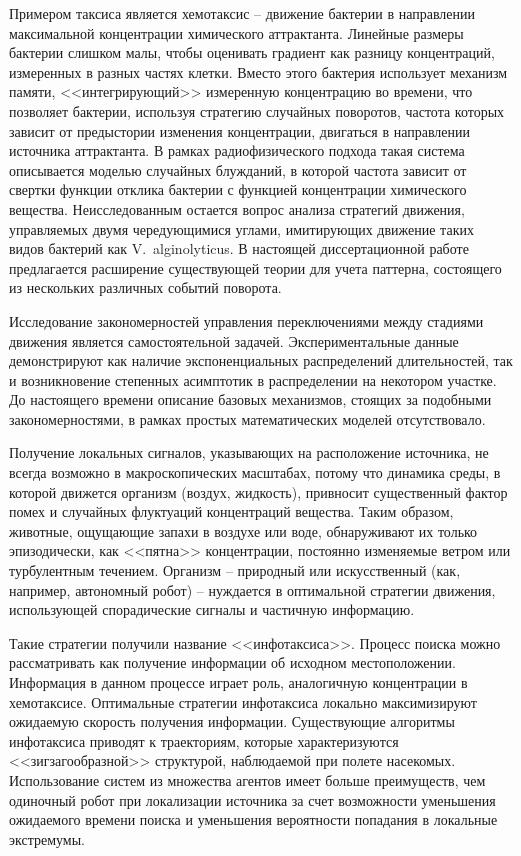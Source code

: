 Примером таксиса является хемотаксис -- движение бактерии в направлении максимальной концентрации химического аттрактанта. Линейные размеры бактерии слишком малы, чтобы оценивать градиент как разницу концентраций, измеренных в разных частях клетки. Вместо этого бактерия использует механизм памяти, <<интегрирующий>> измеренную концентрацию во времени, что позволяет бактерии, используя стратегию случайных поворотов, частота которых зависит от предыстории изменения концентрации, двигаться в направлении источника аттрактанта. В рамках радиофизического подхода такая система описывается моделью случайных блужданий, в которой частота зависит от свертки функции отклика бактерии с функцией концентрации химического вещества. Неисследованным остается вопрос анализа стратегий движения, управляемых двумя чередующимися углами, имитирующих движение таких видов бактерий как V.~alginolyticus. В настоящей диссертационной работе предлагается расширение существующей теории для учета паттерна, состоящего из нескольких различных событий поворота.

Исследование закономерностей управления переключениями между стадиями движения является самостоятельной задачей. Экспериментальные данные демонстрируют как наличие экспоненциальных распределений длительностей, так и возникновение степенных асимптотик в распределении на некотором участке. До настоящего времени описание базовых механизмов, стоящих за подобными закономерностями, в рамках простых математических моделей отсутствовало.

Получение локальных сигналов, указывающих на расположение источника, не всегда возможно в макроскопических масштабах, потому что динамика среды, в которой движется организм (воздух, жидкость), привносит существенный фактор помех и случайных флуктуаций концентраций вещества. Таким образом, животные, ощущающие запахи в воздухе или воде, обнаруживают их только эпизодически, как <<пятна>> концентрации, постоянно изменяемые ветром или турбулентным течением. Организм -- природный или искусственный (как, например, автономный робот) -- нуждается в оптимальной стратегии движения, использующей спорадические сигналы и частичную информацию.

Такие стратегии получили название <<инфотаксиса>>. Процесс поиска можно рассматривать как получение информации об исходном местоположении. Информация в данном процессе играет роль, аналогичную концентрации в хемотаксисе. Оптимальные стратегии инфотаксиса локально максимизируют ожидаемую скорость получения информации. Существующие алгоритмы инфотаксиса приводят к траекториям, которые характеризуются <<зигзагообразной>> структурой, наблюдаемой при полете насекомых. Использование систем из множества агентов имеет больше преимуществ, чем одиночный робот при локализации источника за счет возможности уменьшения ожидаемого времени поиска и уменьшения вероятности попадания в локальные экстремумы.

